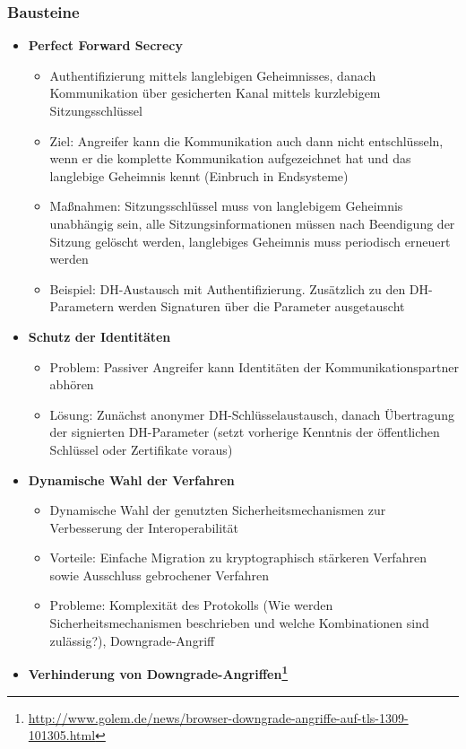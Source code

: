 \subsubsection{Bausteine}
\begin{itemize}
	\item \textbf{Perfect Forward Secrecy}
	\begin{itemize}
		\item Authentifizierung mittels langlebigen Geheimnisses, danach Kommunikation über gesicherten Kanal mittels kurzlebigem Sitzungsschlüssel
		\item Ziel: Angreifer kann die Kommunikation auch dann nicht entschlüsseln, wenn er die komplette Kommunikation aufgezeichnet hat und das langlebige Geheimnis kennt (Einbruch in Endsysteme)
		\item Maßnahmen: Sitzungsschlüssel muss von langlebigem Geheimnis unabhängig sein, alle Sitzungsinformationen müssen nach Beendigung der Sitzung gelöscht werden, langlebiges Geheimnis muss periodisch erneuert werden
		\item Beispiel: DH-Austausch mit Authentifizierung. Zusätzlich zu den DH-Parametern werden Signaturen über die Parameter ausgetauscht
	\end{itemize}
	\item \textbf{Schutz der Identitäten}
	\begin{itemize}
		\item Problem: Passiver Angreifer kann Identitäten der Kommunikationspartner abhören
		\item Lösung: Zunächst anonymer DH-Schlüsselaustausch, danach Übertragung der signierten DH-Parameter (setzt vorherige Kenntnis der öffentlichen Schlüssel oder Zertifikate voraus)
	\end{itemize}
	\item \textbf{Dynamische Wahl der Verfahren}
	\begin{itemize}
		\item Dynamische Wahl der genutzten Sicherheitsmechanismen zur Verbesserung der Interoperabilität
		\item Vorteile: Einfache Migration zu kryptographisch stärkeren Verfahren sowie Ausschluss gebrochener Verfahren
		\item Probleme: Komplexität des Protokolls (Wie werden Sicherheitsmechanismen beschrieben und welche Kombinationen sind zulässig?), Downgrade-Angriff
	\end{itemize}
	\item \textbf{Verhinderung von Downgrade-Angriffen\footnote{\url{http://www.golem.de/news/browser-downgrade-angriffe-auf-tls-1309-101305.html}}}

\end{itemize}
